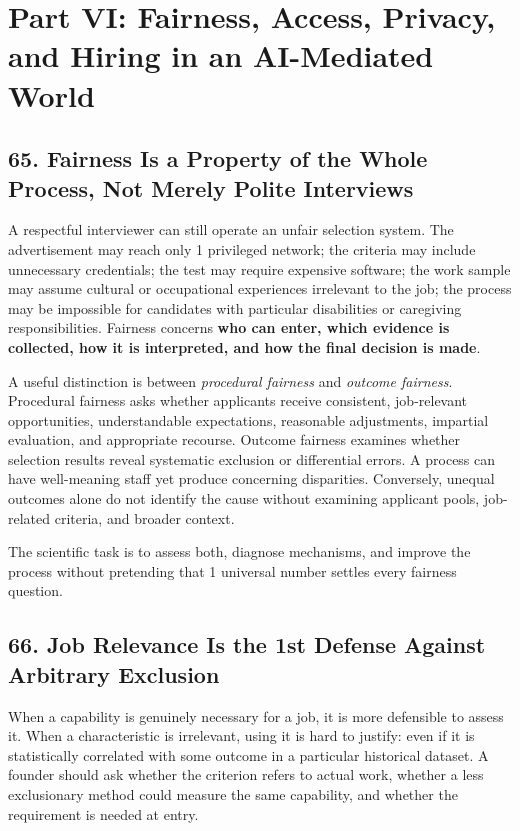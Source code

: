 \section*{Part VI: Fairness, Access, Privacy, and Hiring in an AI-Mediated World}

\subsection*{65. Fairness Is a Property of the Whole Process, Not Merely Polite Interviews}

A respectful interviewer can still operate an unfair selection system. The advertisement may reach only 1 privileged network; the criteria may include unnecessary credentials; the test may require expensive software; the work sample may assume cultural or occupational experiences irrelevant to the job; the process may be impossible for candidates with particular disabilities or caregiving responsibilities. Fairness concerns \textbf{who can enter, which evidence is collected, how it is interpreted, and how the final decision is made}.

A useful distinction is between \textit{procedural fairness} and \textit{outcome fairness}. Procedural fairness asks whether applicants receive consistent, job-relevant opportunities, understandable expectations, reasonable adjustments, impartial evaluation, and appropriate recourse. Outcome fairness examines whether selection results reveal systematic exclusion or differential errors. A process can have well-meaning staff yet produce concerning disparities. Conversely, unequal outcomes alone do not identify the cause without examining applicant pools, job-related criteria, and broader context.

The scientific task is to assess both, diagnose mechanisms, and improve the process without pretending that 1 universal number settles every fairness question.

\subsection*{66. Job Relevance Is the 1st Defense Against Arbitrary Exclusion}

When a capability is genuinely necessary for a job, it is more defensible to assess it. When a characteristic is irrelevant, using it is hard to justify: even if it is statistically correlated with some outcome in a particular historical dataset. A founder should ask whether the criterion refers to actual work, whether a less exclusionary method could measure the same capability, and whether the requirement is needed at entry.

